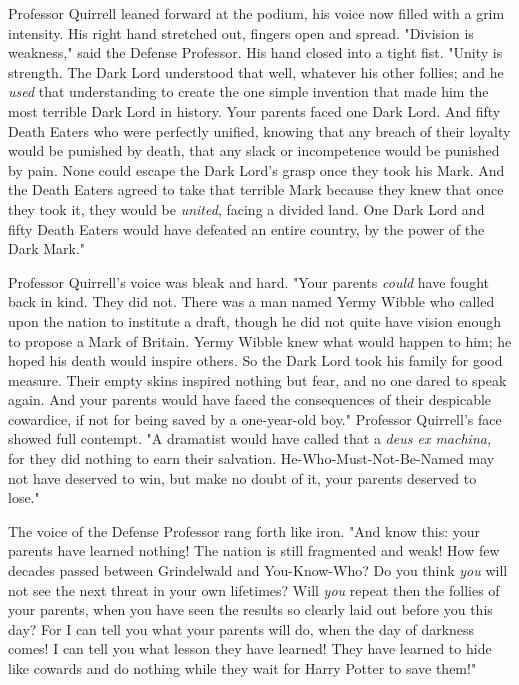 Professor Quirrell leaned forward at the podium, his voice now filled with a
grim intensity. His right hand stretched out, fingers open and spread.
"Division is weakness," said the Defense Professor. His hand closed into a
tight fist. "Unity is strength. The Dark Lord understood that well, whatever
his other follies; and he \emph{used} that understanding to create the one
simple invention that made him the most terrible Dark Lord in history. Your
parents faced one Dark Lord. And fifty Death Eaters who were perfectly unified,
knowing that any breach of their loyalty would be punished by death, that any
slack or incompetence would be punished by pain. None could escape the Dark
Lord's grasp once they took his Mark. And the Death Eaters agreed to take that
terrible Mark because they knew that once they took it, they would be
\emph{united}, facing a divided land. One Dark Lord and fifty Death Eaters
would have defeated an entire country, by the power of the Dark Mark."

Professor Quirrell's voice was bleak and hard. "Your parents \emph{could} have
fought back in kind. They did not. There was a man named Yermy Wibble who
called upon the nation to institute a draft, though he did not quite have
vision enough to propose a Mark of Britain. Yermy Wibble knew what would happen
to him; he hoped his death would inspire others. So the Dark Lord took his
family for good measure. Their empty skins inspired nothing but fear, and no
one dared to speak again. And your parents would have faced the consequences of
their despicable cowardice, if not for being saved by a one-year-old boy."
Professor Quirrell's face showed full contempt. "A dramatist would have called
that a \emph{deus ex machina,} for they did nothing to earn their salvation.
He-Who-Must-Not-Be-Named may not have deserved to win, but make no doubt of it,
your parents deserved to lose."

The voice of the Defense Professor rang forth like iron. "And know this: your
parents have learned nothing! The nation is still fragmented and weak! How few
decades passed between Grindelwald and You-Know-Who? Do you think \emph{you}
will not see the next threat in your own lifetimes? Will \emph{you} repeat then
the follies of your parents, when you have seen the results so clearly laid out
before you this day? For I can tell you what your parents will do, when the day
of darkness comes! I can tell you what lesson they have learned! They have
learned to hide like cowards and do nothing while they wait for Harry Potter to
save them!"

